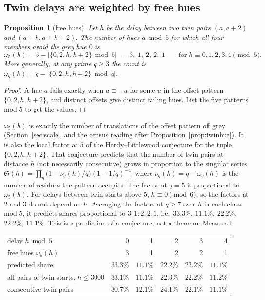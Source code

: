 \documentclass[11pt]{article}
\theoremstyle{plain}
\newtheorem{proposition}[theorem]{Proposition}
\theoremstyle{definition}
\theoremstyle{remark}
\begin{document}
\subsection{Twin delays are weighted by free hues}

\begin{proposition}[free hues]\label{prop:free}
Let $h$ be the delay between two twin pairs $(a,a+2)$ and $(a+h,a+h+2)$. The number of hues
$a\bmod5$ for which all four members avoid the grey hue $0$ is
\[
\omega_5(h)=5-\bigl|\{0,2,h,h+2\}\bmod 5\bigr| \;=\; 3,\ 1,\ 2,\ 2,\ 1
\qquad\text{for } h\equiv0,1,2,3,4\pmod5 .
\]
More generally, at any prime $q\ge3$ the count is $\omega_q(h)=q-|\{0,2,h,h+2\}\bmod q|$.
\end{proposition}
\begin{proof}
A hue $a$ fails exactly when $a\equiv-u$ for some $u$ in the offset pattern $\{0,2,h,h+2\}$, and
distinct offsets give distinct failing hues. List the five patterns mod $5$ to get the values.
\end{proof}

\noindent
$\omega_5(h)$ is exactly the number of translations of the offset pattern off grey
(Section~\ref{sec:scale}, and the census reading after Proposition~\ref{prop:twinhue}). It is also
the local factor at $5$ of the Hardy--Littlewood conjecture for the tuple $\{0,2,h,h+2\}$. That
conjecture predicts that the number of twin pairs at distance $h$ (not necessarily consecutive)
grows in proportion to the singular series
$\mathfrak S(h)=\prod_q\bigl(1-\nu_q(h)/q\bigr)(1-1/q)^{-4}$, where $\nu_q(h)=q-\omega_q(h)$ is the
number of residues the pattern occupies. The factor at $q=5$ is proportional to $\omega_5(h)$.
For delays between twin starts above $5$, $h\equiv0\pmod 6$, so the factors at $2$ and $3$ do not
depend on $h$. Averaging the factors at $q\ge7$ over $h$ in each class mod $5$, it predicts shares proportional to $3:1:2:2:1$, i.e.\ $33.3\%$, $11.1\%$, $22.2\%$,
$22.2\%$, $11.1\%$. This is a prediction of a conjecture, not a theorem. Measured:

\begin{center}
\begin{tabular}{@{}lrrrrr@{}}
\toprule
delay $h \bmod 5$ & 0 & 1 & 2 & 3 & 4\\
free hues $\omega_5(h)$ & 3 & 1 & 2 & 2 & 1\\
\midrule
predicted share & $33.3\%$ & $11.1\%$ & $22.2\%$ & $22.2\%$ & $11.1\%$\\
all pairs of twin starts, $h\le3000$ & $33.1\%$ & $11.1\%$ & $22.3\%$ & $22.2\%$ & $11.2\%$\\
consecutive twin pairs & $30.7\%$ & $12.1\%$ & $24.1\%$ & $22.1\%$ & $11.1\%$\\
\bottomrule
\end{tabular}
\end{center}
\end{document}
